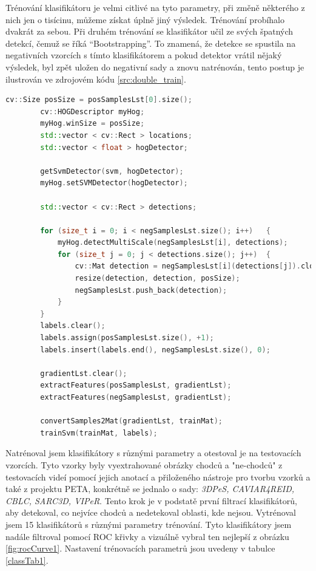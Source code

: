 Trénování klasifikátoru je velmi citlivé na tyto parametry, při změně některého z nich jen o tisícinu, můžeme získat úplně jiný výsledek. Trénování probíhalo dvakrát za sebou. Při druhém trénování se klasifikátor učil ze svých špatných detekcí, čemuž se říká ``Bootstrapping''. To znamená, že detekce se spustila na negativních vzorcích s tímto klasifikátorem a pokud detektor vrátil nějaký výsledek, byl zpět uložen do negativní sady a znovu natrénován, tento postup je ilustrován ve zdrojovém kódu \ref{src:double_train}.
\newpage

\begin{lstlisting}[label=src:double_train, language=cpp, caption=Bootstrapping]
		cv::Size posSize = posSamplesLst[0].size();
		cv::HOGDescriptor myHog;
		myHog.winSize = posSize;
		std::vector < cv::Rect > locations;
		std::vector < float > hogDetector;
		
		getSvmDetector(svm, hogDetector);
		myHog.setSVMDetector(hogDetector);

		std::vector < cv::Rect > detections;

		for (size_t i = 0; i < negSamplesLst.size(); i++)	{
			myHog.detectMultiScale(negSamplesLst[i], detections);
			for (size_t j = 0; j < detections.size(); j++)	{
				cv::Mat detection = negSamplesLst[i](detections[j]).clone();
				resize(detection, detection, posSize);
				negSamplesLst.push_back(detection);
			}
		}
		labels.clear();
		labels.assign(posSamplesLst.size(), +1);
		labels.insert(labels.end(), negSamplesLst.size(), 0);

		gradientLst.clear();
		extractFeatures(posSamplesLst, gradientLst);
		extractFeatures(negSamplesLst, gradientLst);

		convertSamples2Mat(gradientLst, trainMat);
		trainSvm(trainMat, labels);
\end{lstlisting}

Natrénoval jsem klasifikátory s různými parametry a otestoval je na testovacích vzorcích. Tyto vzorky byly vyextrahované obrázky chodců a "ne-chodců" z testovacích videí pomocí jejich anotací a přiloženého nástroje pro tvorbu vzorků a také z projektu PETA, konkrétně se jednalo o sady: \textit{3DPeS, CAVIAR4REID, CBLC, SARC3D, VIPeR}. Tento krok je v podstatě první filtrací klasifikátorů, aby detekoval, co nejvíce chodců a nedetekoval oblasti, kde nejsou. Vytrénoval jsem 15 klasifikátorů s různými parametry trénování. Tyto klasifikátory jsem nadále filtroval pomocí ROC křivky a vizuálně vybral ten nejlepší z obrázku \ref{fig:rocCurve1}.  Nastavení trénovacích parametrů jsou uvedeny v tabulce \ref{classTab1}.  

